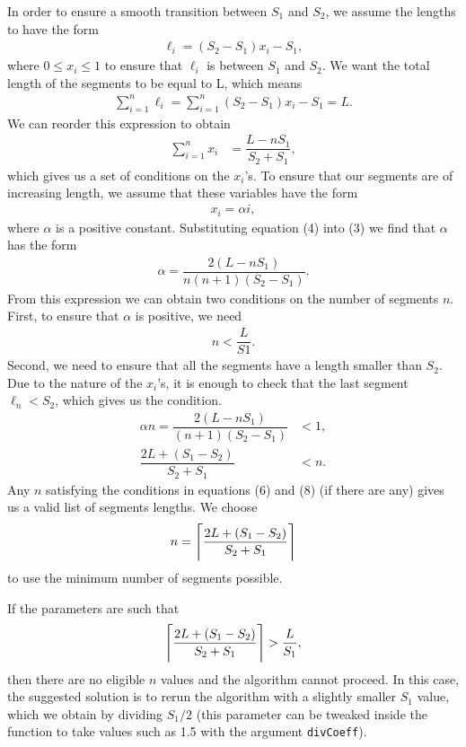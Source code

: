 \documentclass[12pt]{article}
\newcommand{\So}{S_1}
\newcommand{\St}{S_2}
\DeclarePairedDelimiter{\ceil}{\lceil}{\rceil}
\begin{document}
In order to ensure a smooth transition between $\So$ and $\St$, we assume the lengths to have the form 
\begin{align}
    \ell_i = (\St - \So) x_i - \So,
\end{align} 
where $0 \leq x_i \leq 1$ to ensure that $\ell_i$ is between $\So$ and $\St$. 
We want the total length of the segments to be equal to L, which means 
\begin{align}
    \sum_{i=1}^{n} \ell_i = \sum_{i=1}^{n} (\St - \So) x_i - \So = L.
\end{align}
We can reorder this expression to obtain
\begin{align}    
    \sum_{i=1}^{n} x_i &= \dfrac{L - n \So}{\St + \So},
\end{align} 
which gives us a set of conditions on the $x_i$'s. 
To ensure that our segments are of increasing length, we assume that these variables have the form
\begin{align}
    x_i = \alpha i,
\end{align}
where $\alpha$ is a positive constant. Substituting equation (4) into (3) we find that $\alpha$ has the form 
\begin{align}
    \alpha = \dfrac{2 (L - n \So)}{n (n+1) (\St - \So)}.
\end{align}
From this expression we can obtain two conditions on the number of segments $n$. First, to ensure that $\alpha$ is positive, we need 
\begin{align}
    n < \dfrac{L}{S1}.
\end{align}
Second, we need to ensure that all the segments have a length smaller than $\St$. Due to the nature of the $x_i$'s, it is enough to check that the last segment $\ell_n < \St$, which gives us the condition. 
\begin{align}
    \alpha n = \dfrac{2 (L - n \So)}{(n+1) (\St - \So)} &< 1,  \\
    \dfrac{2L + (\So - \St)}{\St + \So} &< n. 
\end{align} 
Any $n$ satisfying the conditions in equations (6) and (8) (if there are any) gives us a valid list of segments lengths. We choose 
\begin{align}
    n = \ceil[\Bigg]{\dfrac{2L + (\So - \St)}{\St + \So}}
\end{align}
to use the minimum number of segments possible. 

If the parameters are such that 
\begin{align}
    \ceil[\Bigg]{\dfrac{2L + (\So - \St)}{\St + \So}} > \dfrac{L}{\So},
\end{align}
then there are no eligible $n$ values and the algorithm cannot proceed. In this case, the suggested solution is to rerun the algorithm with a slightly smaller $\So$ value, which we obtain by dividing $\So / 2$ (this parameter can be tweaked inside the function to take values such as 1.5 with the argument \verb|divCoeff|). 
\end{document}
